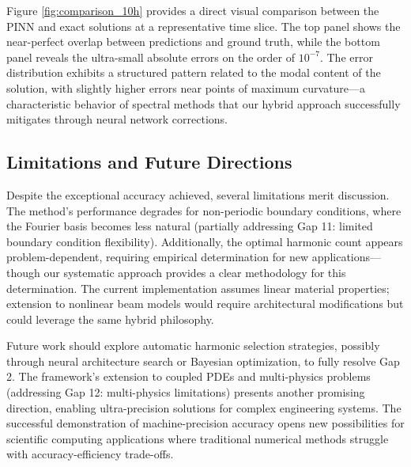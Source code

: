Figure \ref{fig:comparison_10h} provides a direct visual comparison between the PINN and exact solutions at a representative time slice. The top panel shows the near-perfect overlap between predictions and ground truth, while the bottom panel reveals the ultra-small absolute errors on the order of $10^{-7}$. The error distribution exhibits a structured pattern related to the modal content of the solution, with slightly higher errors near points of maximum curvature—a characteristic behavior of spectral methods that our hybrid approach successfully mitigates through neural network corrections.

\subsection{Limitations and Future Directions}

Despite the exceptional accuracy achieved, several limitations merit discussion. The method's performance degrades for non-periodic boundary conditions, where the Fourier basis becomes less natural (partially addressing Gap 11: limited boundary condition flexibility). Additionally, the optimal harmonic count appears problem-dependent, requiring empirical determination for new applications—though our systematic approach provides a clear methodology for this determination. The current implementation assumes linear material properties; extension to nonlinear beam models would require architectural modifications but could leverage the same hybrid philosophy.

Future work should explore automatic harmonic selection strategies, possibly through neural architecture search or Bayesian optimization, to fully resolve Gap 2. The framework's extension to coupled PDEs and multi-physics problems (addressing Gap 12: multi-physics limitations) presents another promising direction, enabling ultra-precision solutions for complex engineering systems. The successful demonstration of machine-precision accuracy opens new possibilities for scientific computing applications where traditional numerical methods struggle with accuracy-efficiency trade-offs.




